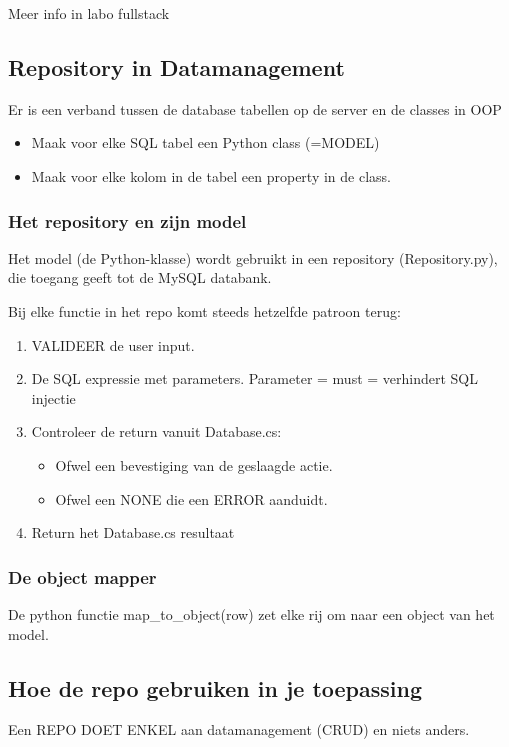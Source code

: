 \documentclass{article}
\begin{document}
Meer info in labo fullstack

\subsection{Repository in Datamanagement}
Er is een verband tussen de database tabellen op de server en de classes in OOP

\begin{itemize}
    \item Maak voor elke SQL tabel een Python class (=MODEL)
    \item Maak voor elke kolom in de tabel een property in de class.
\end{itemize}

\subsubsection{Het repository en zijn model}
Het model (de Python-klasse) wordt gebruikt in een repository (Repository.py), die toegang geeft tot de MySQL databank.

Bij elke functie in het repo komt steeds hetzelfde patroon terug:
\begin{enumerate}
    \item VALIDEER de user input.
    \item De SQL expressie met parameters. Parameter = must = verhindert SQL injectie
    \item Controleer de return vanuit Database.cs:
    \begin{itemize}
        \item Ofwel een bevestiging van de geslaagde actie.
        \item Ofwel een NONE die een ERROR aanduidt.
    \end{itemize}
    \item Return het Database.cs resultaat
\end{enumerate}

\subsubsection{De object mapper}
De python functie map\_to\_object(row) zet elke rij om naar een object van het model.

\subsection{Hoe de repo gebruiken in je toepassing}
Een REPO DOET ENKEL aan datamanagement (CRUD) en niets anders.
\end{document}
